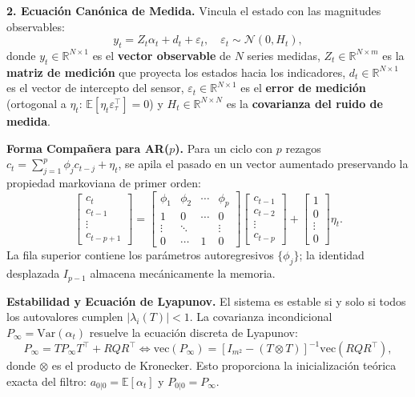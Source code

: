 \documentclass[10pt,twocolumn]{article}
\begin{document}
\noindent\textbf{2. Ecuación Canónica de Medida.} Vincula el estado con las magnitudes observables:
\begin{equation}
y_t = Z_t \alpha_t + d_t + \varepsilon_t, \quad \varepsilon_t \sim \mathcal{N}(0, H_t), \tag{3}
\end{equation}
donde $y_t \in \mathbb{R}^{N \times 1}$ es el \textbf{vector observable} de $N$ series medidas, $Z_t \in \mathbb{R}^{N \times m}$ es la \textbf{matriz de medición} que proyecta los estados hacia los indicadores, $d_t \in \mathbb{R}^{N \times 1}$ es el vector de intercepto del sensor, $\varepsilon_t \in \mathbb{R}^{N \times 1}$ es el \textbf{error de medición} (ortogonal a $\eta_t$: $\mathbb{E}[\eta_t \varepsilon_\tau^\top] = 0$) y $H_t \in \mathbb{R}^{N \times N}$ es la \textbf{covarianza del ruido de medida}.

\noindent\textbf{Forma Compañera para AR($p$).} Para un ciclo con $p$ rezagos $c_t = \sum_{j=1}^p \phi_j c_{t-j} + \eta_t$, se apila el pasado en un vector aumentado preservando la propiedad markoviana de primer orden:
\begin{equation}
\begin{bmatrix} c_t \\ c_{t-1} \\ \vdots \\ c_{t-p+1} \end{bmatrix} = \begin{bmatrix} \phi_1 & \phi_2 & \cdots & \phi_p \\ 1 & 0 & \cdots & 0 \\ \vdots & \ddots & & \vdots \\ 0 & \cdots & 1 & 0 \end{bmatrix} \begin{bmatrix} c_{t-1} \\ c_{t-2} \\ \vdots \\ c_{t-p} \end{bmatrix} + \begin{bmatrix} 1 \\ 0 \\ \vdots \\ 0 \end{bmatrix} \eta_t. \tag{4}
\end{equation}
La fila superior contiene los parámetros autoregresivos $\{\phi_j\}$; la identidad desplazada $I_{p-1}$ almacena mecánicamente la memoria.

\noindent\textbf{Estabilidad y Ecuación de Lyapunov.} El sistema es estable si y solo si todos los autovalores cumplen $|\lambda_i(T)| < 1$. La covarianza incondicional $P_\infty = \text{Var}(\alpha_t)$ resuelve la ecuación discreta de Lyapunov:
\begin{equation}
P_\infty = T P_\infty T^\top + R Q R^\top \iff \text{vec}(P_\infty) = [I_{m^2} - (T \otimes T)]^{-1} \text{vec}(R Q R^\top), \tag{5}
\end{equation}
donde $\otimes$ es el producto de Kronecker. Esto proporciona la inicialización teórica exacta del filtro: $a_{0|0} = \mathbb{E}[\alpha_t]$ y $P_{0|0} = P_\infty$.
\end{document}
